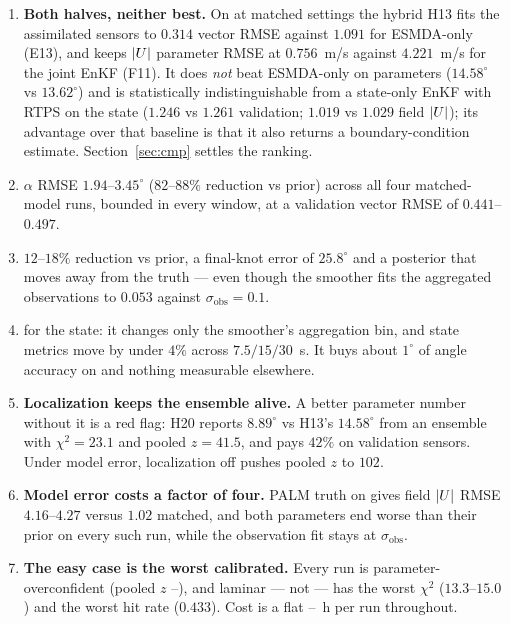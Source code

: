 \begin{enumerate}[nosep]
  \item \textbf{Both halves, neither best.} On  at matched
        settings the hybrid H13 fits the assimilated sensors to $0.314$ vector
        RMSE against $1.091$ for ESMDA-only (E13), and keeps $|U|$ parameter
        RMSE at $0.756$~m/s against $4.221$~m/s for the joint EnKF (F11). It does
        \emph{not} beat ESMDA-only on parameters ($14.58^\circ$ vs $13.62^\circ$)
        and is statistically indistinguishable from a state-only EnKF with RTPS
        on the state ($1.246$ vs $1.261$ validation; $1.019$ vs $1.029$ field
        $|U|$); its advantage over that baseline is that it also returns a
        boundary-condition estimate. Section~\ref{sec:cmp} settles the ranking.
  \item {} $\alpha$
        RMSE $1.94$--$3.45^\circ$ ($82$--$88\%$ reduction vs prior) across all
        four matched-model runs, bounded in every window, at a validation vector
        RMSE of $0.441$--$0.497$.
  \item {} $12$--$18\%$ reduction
        vs prior, a final-knot error of $25.8^\circ$ and a posterior that moves
        away from the truth --- even though the smoother fits the aggregated
        observations to $0.053$ against $\sigma_{\mathrm{obs}} = 0.1$.
  \item {} for the state: it changes
        only the smoother's aggregation bin, and state metrics move by under
        $4\%$ across $7.5/15/30$~s. It buys about $1^\circ$ of angle accuracy on
         and nothing measurable elsewhere.
  \item \textbf{Localization keeps the ensemble alive.} A better parameter number
        without it is a red flag: H20 reports $8.89^\circ$ vs H13's $14.58^\circ$
        from an ensemble with $\chi^2 = 23.1$ and pooled $z = 41.5$, and pays
        $42\%$ on validation sensors. Under model error, localization off pushes
        pooled $z$ to $102$.
  \item \textbf{Model error costs a factor of four.} PALM truth on
         gives field $|U|$ RMSE $4.16$--$4.27$ versus $1.02$
        matched, and both parameters end worse than their prior on every such
        run, while the observation fit stays at $\sigma_{\mathrm{obs}}$.
  \item \textbf{The easy case is the worst calibrated.} Every run is
        parameter-overconfident (pooled $z$ \HybZMin--\HybZMax), and laminar
         --- not  --- has the worst $\chi^2$
        ($13.3$--$15.0$) and the worst hit rate ($0.433$). Cost is a flat
        \HybWallMin--\HybWallMax~h per run throughout.
\end{enumerate}

